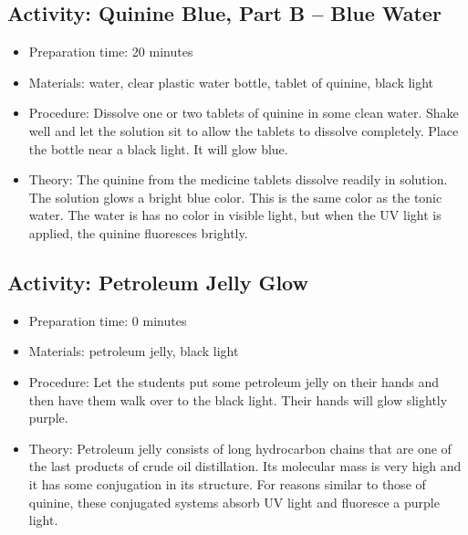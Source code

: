 \begin{itemize}
{\subsection{Activity: Quinine Blue, Part B – Blue Water}
\begin{itemize}
\item{Preparation time: 20 minutes}
\item{Materials: water, clear plastic water bottle, tablet of quinine, black light}
\item{Procedure: Dissolve one or two tablets of quinine in some clean water. Shake well and let the solution sit to allow the tablets to dissolve completely. Place the bottle near a black light. It will glow blue.}
\item{Theory: The quinine from the medicine tablets dissolve readily in solution. The solution glows a bright blue color. This is the same color as the tonic water. The water is has no color in visible light, but when the UV light is applied, the quinine fluoresces brightly.}
\end{itemize}

\subsection{Activity: Petroleum Jelly Glow}
\begin{itemize}
\item{Preparation time: 0 minutes}
\item{Materials: petroleum jelly, black light}
\item{Procedure: Let the students put some petroleum jelly on their hands and then have them walk over to the black light. Their hands will glow slightly purple.}
\item{Theory: Petroleum jelly consists of long hydrocarbon chains that are one of the last products of crude oil distillation. Its molecular mass is very high and it has some conjugation in its structure. For reasons similar to those of quinine, these conjugated systems absorb UV light and fluoresce a purple light. }
\end{itemize}

}
\end{itemize}
